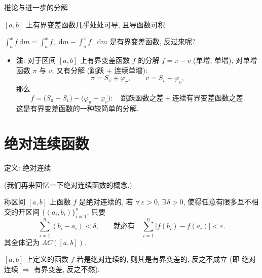 \begin{frame}{推论与进一步的分解}

\begin{cor}
$[a, b]$ 上有界变差函数几乎处处可导, 且导函数可积.
\end{cor}

\begin{question}
$\int_a^x f ~ \mathrm{d} m = \int_a^x f_+ ~ \mathrm{d} m - \int_a^x f_- ~ \mathrm{d} m$
是有界变差函数, 反过来呢?
\end{question}

\pause

\begin{itemize}
\item \textbf{注}: 对于区间 $[a, b]$ 上有界变差函数 $f$ 的分解 $f = \pi - v$
  (单增, 单增), 对单增函数 $\pi$ 与 $v$, 又有分解 (跳跃 $+$ 连续单增):
\[
\pi = S_\pi + \varphi_\pi,
\qquad
v = S_v + \varphi_v ,
\]
那么
\[
f = \big( S_\pi - S_v \big) - \big( \varphi_\pi - \varphi_v \big) :
\quad
\text{跳跃函数之差} + \text{连续有界变差函数之差} .
\]
这是有界变差函数的一种较简单的分解.
\end{itemize}

\end{frame}


\section[绝对连续]{绝对连续函数}


\begin{frame}{定义: 绝对连续}

(我们再来回忆一下绝对连续函数的概念.)

\begin{Def}[绝对连续]
称区间 $[a, b]$ 上函数 $f$ 是\alert{绝对连续}的, 若 $\forall\, \varepsilon > 0$,
$\exists\, \delta > 0$, 使得任意有限多互不相交的开区间
$\{ (a_i, b_i) \}_{i=1}^n$, 只要
\[
\sum_{i=1}^{n} (b_i - a_i) < \delta ,
\qquad
\text{就必有}\quad
\sum_{i=1}^{n} \big| f(b_i) - f(a_i) \big| < \varepsilon .
\]
其全体记为 $AC([a, b])$.
\end{Def}

\pause

\begin{prop}
$[a, b]$ 上定义的函数 $f$ 若是绝对连续的, 则其是有界变差的, 反之不成立
(即 绝对连续 $\Longrightarrow$ 有界变差, 反之不然).
\end{prop}

\end{frame}

